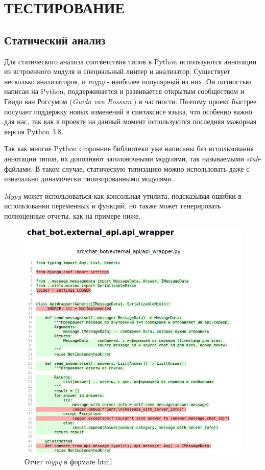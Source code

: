 \section{ТЕСТИРОВАНИЕ}
    \subsection{Статический анализ}
    Для статического анализа соответствия типов в Python используются аннотации 
    из встроенного модуля  и специальный линтер и анализатор.
    Существует несколько анализаторов,
    и \textit{mypy}\cite{mypy} - наиболее популярный из них.
    Он полностью написан на Python, поддерживается и развивается открытым
    сообществом 
    и Гвидо ван Россумом (\textit{Guido van Rossum} \cite{guido.van.rossum})
    в частности. Поэтому проект быстрее получает поддержку новых изменений в
    синтаксисе языка, что особенно важно для нас, так как в проекте на данный
    момент используются последняя мажорная версия Python 3.8.

    Так как многие Python сторонние библиотеки уже написаны без использования
    аннотации типов, их дополняют заголовочными модулями,
    так называемыми \textit{stub}-файлами. В таком случае, статическую типизацию
    можно использовать даже с изначально динамически типизированными модулями.
    
    \textit{Mypy} может использоваться как консольная утилита, подсказывая ошибки в
    использовании переменных и функций, но также может генерировать полноценные
    отчеты, как на примере ниже.
    \begin{figure}[H]
        \centering
        \includegraphics[width=\linewidth]{static/mypy-report.png}
        \caption{Отчет \textit{mypy} в формате html}
        \label{fig:mypy-report}
    \end{figure}
    
